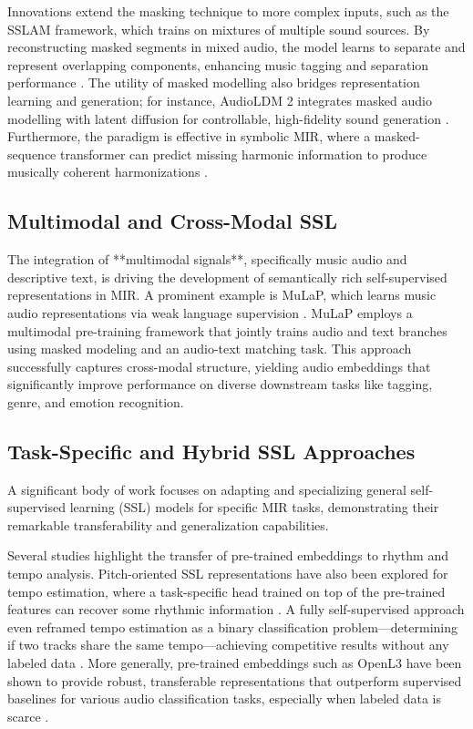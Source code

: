 \documentclass[12pt]{report}
\begin{document}
Innovations extend the masking technique to more complex inputs, such as the SSLAM framework, which trains on mixtures of multiple sound sources. By reconstructing masked segments in mixed audio, the model learns to separate and represent overlapping components, enhancing music tagging and separation performance \cite{alex_sslam_2025}. The utility of masked modelling also bridges representation learning and generation; for instance, AudioLDM 2 integrates masked audio modelling with latent diffusion for controllable, high-fidelity sound generation \cite{liu_audioldm_2024}. Furthermore, the paradigm is effective in symbolic MIR, where a masked-sequence transformer can predict missing harmonic information to produce musically coherent harmonizations \cite{rhyu_translating_2022}.


\subsection{Multimodal and Cross-Modal SSL}


The integration of **multimodal signals**, specifically music audio and descriptive text, is driving the development of semantically rich self-supervised representations in MIR. A prominent example is MuLaP, which learns music audio representations via weak language supervision \cite{manco_learning_2022}. MuLaP employs a multimodal pre-training framework that jointly trains audio and text branches using masked modeling and an audio-text matching task. This approach successfully captures cross-modal structure, yielding audio embeddings that significantly improve performance on diverse downstream tasks like tagging, genre, and emotion recognition.

\subsection{Task-Specific and Hybrid SSL Approaches}


A significant body of work focuses on adapting and specializing general self-supervised learning (SSL) models for specific MIR tasks, demonstrating their remarkable transferability and generalization capabilities.

Several studies highlight the transfer of pre-trained embeddings to rhythm and tempo analysis. Pitch-oriented SSL representations have also been explored for tempo estimation, where a task-specific head trained on top of the pre-trained features can recover some rhythmic information \cite{gagnere_adapting_2024}. A fully self-supervised approach even reframed tempo estimation as a binary classification problem—determining if two tracks share the same tempo—achieving competitive results without any labeled data \cite{henkel_tempo_2024}. More generally, pre-trained embeddings such as OpenL3 have been shown to provide robust, transferable representations that outperform supervised baselines for various audio classification tasks, especially when labeled data is scarce \cite{grollmisch_analyzing_2021}.
\end{document}
